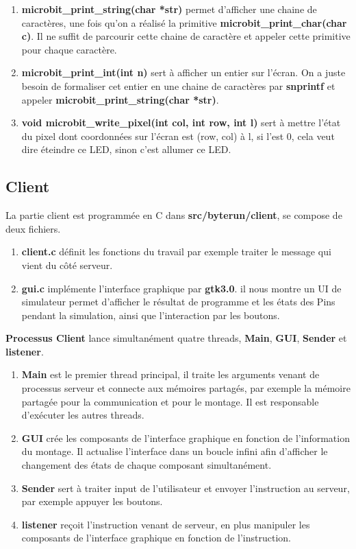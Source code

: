 \documentclass[14px]{article}
\begin{document}
\begin{enumerate}
		\item \textbf{microbit\_print\_string(char *str)} permet d'afficher une chaine de caractères, une fois qu'on a réalisé la primitive \textbf{microbit\_print\_char(char c)}. Il ne suffit de parcourir cette chaine de caractère et appeler cette primitive pour chaque caractère.
		\item \textbf{microbit\_print\_int(int n)} sert à afficher un entier sur l'écran. On a juste besoin de formaliser cet entier en une chaine de caractères par \textbf{snprintf} et appeler \textbf{microbit\_print\_string(char *str)}.
		\item \textbf{void microbit\_write\_pixel(int col, int row, int l)} sert à mettre l'état du pixel dont coordonnées sur l'écran est (row, col) à l, si l’est 0, cela veut dire éteindre ce LED, sinon c'est allumer ce LED.
		
	\end{enumerate}
	
	
	
	\subsection{Client}
	La partie client est programmée en C dans \textbf{src/byterun/client}, se compose de deux fichiers.
	\begin{enumerate}
		\item \textbf{client.c} définit les fonctions du travail par exemple traiter le message qui vient du côté serveur.
		
		\item \textbf{gui.c} implémente l'interface graphique par \textbf{gtk3.0}.
		il nous montre un UI de simulateur permet d'afficher le résultat de programme et les états des Pins pendant la simulation, ainsi que l'interaction par les boutons.\\
	\end{enumerate}
	
	\textbf{Processus Client} lance simultanément quatre threads, \textbf{Main}, \textbf{GUI}, \textbf{Sender} et \textbf{listener}.
	\begin{enumerate}
		\item \textbf{Main} est le premier thread principal, il traite les arguments venant de processus serveur et connecte aux mémoires partagés, par exemple la mémoire partagée pour la communication et pour le montage. Il est responsable d'exécuter les autres threads.
		\item \textbf{GUI} crée les composants de l'interface graphique en fonction de l'information du montage. Il actualise l'interface dans un boucle infini afin d'afficher le changement des états de chaque composant simultanément.
		\item \textbf{Sender} sert à traiter input de l'utilisateur et envoyer l'instruction au serveur, par exemple appuyer les boutons.
		\item \textbf{listener} reçoit l'instruction venant de serveur, en plus manipuler les composants de l'interface graphique en fonction de l'instruction.
	\end{enumerate}
	
\end{document}
